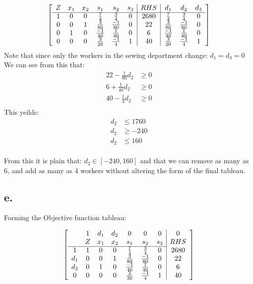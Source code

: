 \documentclass[10pt, letterpaper]{paper}
\begin{document}
\[
	\left[ {\begin{array}{cccccc|c|cccc}
	Z & x_1 & x_2 & s_1 & s_2 & s_3 & RHS & d_1 & d_2 & d_3\\ \cline{1-10}
	1 & 0 & 0 & \frac{7}{4} & \frac{3}{4} & 0 & 2680 & \frac{7}{4} & \frac{3}{4} & 0\\
	0 & 0 & 1 & \frac{3}{80} & \frac{-1}{80} & 0 &22& \frac{3}{80} & \frac{-1}{80} & 0\\
	0 & 1 & 0 & \frac{-1}{40} & \frac{1}{40} & 0 & 6 & \frac{-1}{40} & \frac{1}{40} & 0\\
	0 & 0 & 0 & \frac{3}{20} & \frac{-1}{4} & 1 & 40 & \frac{3}{20} & \frac{-1}{4} & 1\\
	\end{array} } \right]
\]
Note that since only the workers in the sewing department change: $d_1 = d_3 = 0$
\newline
We can see from this that: 
\begin{eqnarray*}
22 - \frac{1}{80} d_2 &\geq 0\\
6 + \frac{1}{40} d_2 &\geq 0\\
40 - \frac{1}{4} d_2 &\geq 0\\
\end{eqnarray*}
This yeilds: 
\begin{eqnarray*}
d_2 &\leq 1760\\
d_2 &\geq -240\\
d_2 &\leq 160\\
\end{eqnarray*}

From this it is plain that: $d_2 \in [-240,160]$ and that we can remove as many as 6, and add as many as 4 workers without altering the form of the final tableau.

\subsection*{e.}
Forming the Objective function tableau:

\[
	\left[ {\begin{array}{ccccccc|c}
	 & 1 & d_1 &d_2 & 0 &0 &0& 0\\
	 & Z & x_1 & x_2 & s_1 & s_2 & s_3 & RHS\\ \cline{1-7}
	1& 1 & 0 & 0 & \frac{7}{4} & \frac{3}{4} & 0 & 2680 \\
	d_1 & 0 & 0 & 1 & \frac{3}{80} & \frac{-1}{80} & 0 &22\\
	d_2 & 0 & 1 & 0 & \frac{-1}{40} & \frac{1}{40} & 0 & 6\\
	0 & 0 & 0 & 0 & \frac{3}{20} & \frac{-1}{4} & 1 & 40 \\
	\end{array} } \right]
\]
\end{document}
